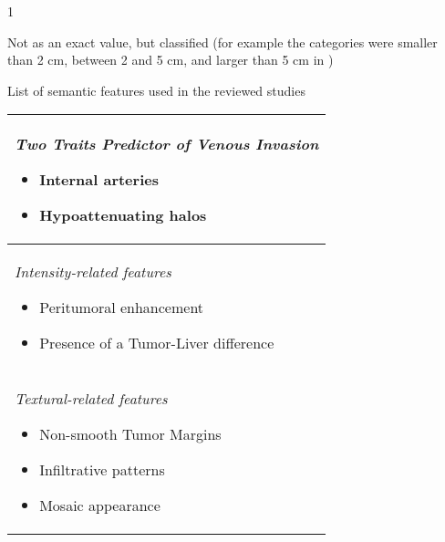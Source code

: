 \begin{minipage}{17cm}
\begin{threeparttable}
\begin{tablenotes}
\item[1] {Not as an exact value, but classified (for example
the categories were smaller than 2 cm, between 2 and 5 cm, and larger than 5 cm in \cite{Renzulli2016})\par} 
\end{tablenotes}
\end{threeparttable}
\hspace{0.5cm}
\begin{threeparttable}
\caption{List of semantic features used in the reviewed studies}
\label{tab:SemanticFeatures}
\begin{tabularx}{7.5cm}{|X|}
\hline
\emph{Two Traits Predictor of Venous Invasion}
\begin{itemize}
\item Internal arteries \cite{Renzulli2016,Kuo2007,Peng2018,Segal2007,Banerjee2015,Taouli2017}
\item Hypoattenuating halos \cite{Renzulli2016,Peng2018,Segal2007,Banerjee2015}
\end{itemize} \\ \hline
\emph{Intensity-related features}
\begin{itemize}
\item Peritumoral enhancement \cite{Renzulli2016}
\item Presence of a Tumor-Liver difference \cite{Banerjee2015}
\end{itemize} \\ \hline
\emph{Textural-related features}
\begin{itemize}
\item Non-smooth Tumor Margins \cite{Renzulli2016,Kuo2007,Peng2018}
\item Infiltrative patterns \cite{Taouli2017}
\item Mosaic appearance \cite{Taouli2017}
\end{itemize} \\
\hline
\end{tabularx}
\end{threeparttable}
\end{minipage}


\renewcommand{\arraystretch}{5}
\renewcommand{\baselinestretch}{1.75}